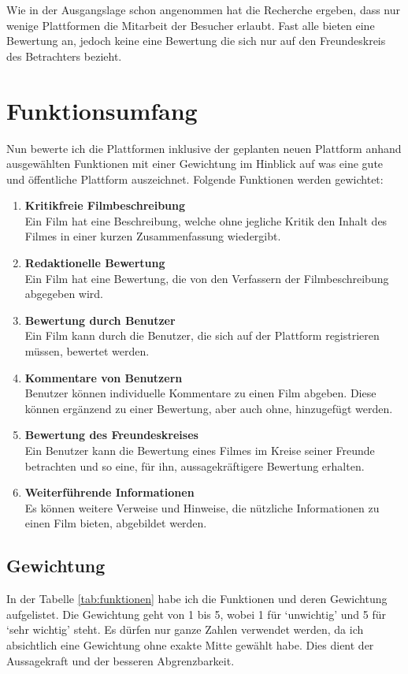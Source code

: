 Wie in der Ausgangslage schon angenommen hat die Recherche ergeben, dass nur
wenige Plattformen die Mitarbeit der Besucher erlaubt. Fast alle bieten
eine Bewertung an, jedoch keine eine Bewertung die sich nur auf den
Freundeskreis des Betrachters bezieht.

\section{Funktionsumfang}
Nun bewerte ich die Plattformen inklusive der geplanten neuen Plattform anhand
ausgewählten Funktionen mit einer Gewichtung im Hinblick auf was eine gute und
öffentliche Plattform auszeichnet.
Folgende Funktionen werden gewichtet:

\begin{enumerate}
    \item \textbf{Kritikfreie Filmbeschreibung}\\
          Ein Film hat eine Beschreibung, welche ohne jegliche Kritik den Inhalt
          des Filmes in einer kurzen Zusammenfassung wiedergibt.
    \item \textbf{Redaktionelle Bewertung}\\
          Ein Film hat eine Bewertung, die von den Verfassern der Filmbeschreibung 
          abgegeben wird.
    \item \textbf{Bewertung durch Benutzer}\\
          Ein Film kann durch die Benutzer, die sich auf der Plattform
          registrieren müssen, bewertet werden.
    \item \textbf{Kommentare von Benutzern}\\
          Benutzer können individuelle Kommentare zu einen Film abgeben. Diese
          können ergänzend zu einer Bewertung, aber auch ohne, hinzugefügt werden.
    \item \textbf{Bewertung des Freundeskreises}\\
          Ein Benutzer kann die Bewertung eines Filmes im Kreise seiner Freunde
          betrachten und so eine, für ihn, aussagekräftigere Bewertung erhalten.
    \item \textbf{Weiterführende Informationen}\\
          Es können weitere Verweise und Hinweise, die nützliche Informationen
          zu einen Film bieten, abgebildet werden.
\end{enumerate}

\subsection{Gewichtung}
In der Tabelle \ref{tab:funktionen} habe ich die Funktionen und deren Gewichtung
aufgelistet. Die Gewichtung geht von 1 bis 5, wobei 1 für `unwichtig' und 5 für
`sehr wichtig' steht. Es dürfen nur ganze Zahlen verwendet werden, da ich 
absichtlich eine Gewichtung ohne exakte Mitte gewählt habe. Dies dient der
Aussagekraft und der besseren Abgrenzbarkeit.

